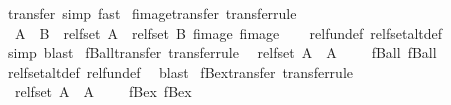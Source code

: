 \begin{isabellebody}
\ transfer\ {\isacharparenleft}simp{\isacharcomma}\ fast{\isacharparenright}%
\endisatagproof
{\isafoldproof}%
%
\isadelimproof
\isanewline
%
\endisadelimproof
\isanewline
{}\isamarkupfalse%
\ fimage{\isacharunderscore}transfer\ {\isacharbrackleft}transfer{\isacharunderscore}rule{\isacharbrackright}{\isacharcolon}\isanewline
\ \ {\isachardoublequoteopen}{\isacharparenleft}{\isacharparenleft}A\ {\isacharequal}{\isacharequal}{\isacharequal}{\isachargreater}\ B{\isacharparenright}\ {\isacharequal}{\isacharequal}{\isacharequal}{\isachargreater}\ rel{\isacharunderscore}fset\ A\ {\isacharequal}{\isacharequal}{\isacharequal}{\isachargreater}\ rel{\isacharunderscore}fset\ B{\isacharparenright}\ fimage\ fimage{\isachardoublequoteclose}\isanewline
%
\isadelimproof
\ \ %
\endisadelimproof
%
\isatagproof
{}\isamarkupfalse%
\ rel{\isacharunderscore}fun{\isacharunderscore}def\ rel{\isacharunderscore}fset{\isacharunderscore}alt{\isacharunderscore}def\ \isamarkupfalse%
\ simp\ blast%
\endisatagproof
{\isafoldproof}%
%
\isadelimproof
\isanewline
%
\endisadelimproof
\isanewline
{}\isamarkupfalse%
\ fBall{\isacharunderscore}transfer\ {\isacharbrackleft}transfer{\isacharunderscore}rule{\isacharbrackright}{\isacharcolon}\isanewline
\ \ {\isachardoublequoteopen}{\isacharparenleft}rel{\isacharunderscore}fset\ A\ {\isacharequal}{\isacharequal}{\isacharequal}{\isachargreater}\ {\isacharparenleft}A\ {\isacharequal}{\isacharequal}{\isacharequal}{\isachargreater}\ {\isacharparenleft}{\isacharequal}{\isacharparenright}{\isacharparenright}\ {\isacharequal}{\isacharequal}{\isacharequal}{\isachargreater}\ {\isacharparenleft}{\isacharequal}{\isacharparenright}{\isacharparenright}\ fBall\ fBall{\isachardoublequoteclose}\isanewline
%
\isadelimproof
\ \ %
\endisadelimproof
%
\isatagproof
{}\isamarkupfalse%
\ rel{\isacharunderscore}fset{\isacharunderscore}alt{\isacharunderscore}def\ rel{\isacharunderscore}fun{\isacharunderscore}def\ \isamarkupfalse%
\ blast%
\endisatagproof
{\isafoldproof}%
%
\isadelimproof
\isanewline
%
\endisadelimproof
\isanewline
{}\isamarkupfalse%
\ fBex{\isacharunderscore}transfer\ {\isacharbrackleft}transfer{\isacharunderscore}rule{\isacharbrackright}{\isacharcolon}\isanewline
\ \ {\isachardoublequoteopen}{\isacharparenleft}rel{\isacharunderscore}fset\ A\ {\isacharequal}{\isacharequal}{\isacharequal}{\isachargreater}\ {\isacharparenleft}A\ {\isacharequal}{\isacharequal}{\isacharequal}{\isachargreater}\ {\isacharparenleft}{\isacharequal}{\isacharparenright}{\isacharparenright}\ {\isacharequal}{\isacharequal}{\isacharequal}{\isachargreater}\ {\isacharparenleft}{\isacharequal}{\isacharparenright}{\isacharparenright}\ fBex\ fBex{\isachardoublequoteclose}\isanewline

\end{isabellebody}
